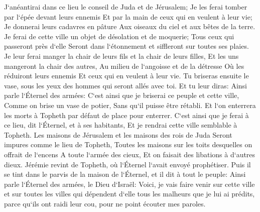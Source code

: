 \verse J`anéantirai dans ce lieu le conseil de Juda et de Jérusalem; Je les ferai tomber par l`épée devant leurs ennemis Et par la main de ceux qui en veulent à leur vie; Je donnerai leurs cadavres en pâture Aux oiseaux du ciel et aux bêtes de la terre. 
\verse Je ferai de cette ville un objet de désolation et de moquerie; Tous ceux qui passeront près d`elle Seront dans l`étonnement et siffleront sur toutes ses plaies. 
\verse Je leur ferai manger la chair de leurs fils et la chair de leurs filles, Et les uns mangeront la chair des autres, Au milieu de l`angoisse et de la détresse Où les réduiront leurs ennemis Et ceux qui en veulent à leur vie. 
\verse Tu briseras ensuite le vase, sous les yeux des hommes qui seront allés avec toi. 
\verse Et tu leur diras: Ainsi parle l`Éternel des armées: C`est ainsi que je briserai ce peuple et cette ville, Comme on brise un vase de potier, Sans qu`il puisse être rétabli. Et l`on enterrera les morts à Topheth par défaut de place pour enterrer. 
\verse C`est ainsi que je ferai à ce lieu, dit l`Éternel, et à ses habitants, Et je rendrai cette ville semblable à Topheth. 
\verse Les maisons de Jérusalem et les maisons des rois de Juda Seront impures comme le lieu de Topheth, Toutes les maisons sur les toits desquelles on offrait de l`encens A toute l`armée des cieux, Et on faisait des libations à d`autres dieux. 
\verse Jérémie revint de Topheth, où l`Éternel l`avait envoyé prophétiser. Puis il se tint dans le parvis de la maison de l`Éternel, et il dit à tout le peuple: 
\verse Ainsi parle l`Éternel des armées, le Dieu d`Israël: Voici, je vais faire venir sur cette ville et sur toutes les villes qui dépendent d`elle tous les malheurs que je lui ai prédits, parce qu`ils ont raidi leur cou, pour ne point écouter mes paroles. 

